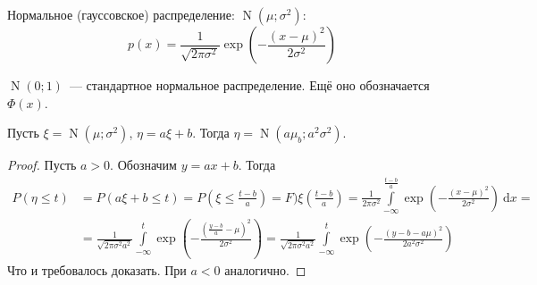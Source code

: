 \documentclass{article}
\begin{document}
    \begin{example}
        Нормальное (гауссовское) распределение: $\operatorname{N}(\mu;\sigma^2)$:
        $$
        p(x)=\frac1{\sqrt{2\pi\sigma^2}}\exp\left(-\frac{(x-\mu)^2}{2\sigma^2}\right)
        $$
        \begin{figure}[H]
        \end{figure}\noindent
        $\operatorname{N}(0;1)$~--- стандартное нормальное распределение. Ещё оно обозначается $\Phi(x)$.
    \end{example}
    \begin{claim}
        Пусть $\xi=\operatorname{N}(\mu;\sigma^2)$, $\eta=a\xi+b$. Тогда
        $\eta=\operatorname{N}(a\mu_b;a^2\sigma^2)$.
    \end{claim}
    \begin{proof}
        Пусть $a>0$. Обозначим $y=ax+b$. Тогда
        \[\begin{split}
            P(\eta\leqslant t)&=P(a\xi+b\leqslant t)=P(\xi\leqslant\frac{t-b}a)=F)\xi(\frac{t-b}a)=\frac1{2\pi\sigma^2}\int\limits_{-\infty}^{\frac{t-b}a}\exp\left(-\frac{(x-\mu)^2}{2\sigma^2}\right)~\mathrm dx=\\
            &=\frac1{\sqrt{2\pi\sigma^2a^2}}\int\limits_{-\infty}^t\exp\left(-\frac{(\frac{y-b}a-\mu)^2}{2\sigma^2}\right)=\frac1{\sqrt{2\pi\sigma^2a^2}}\int\limits_{-\infty}^t\exp\left(-\frac{(y-b-a\mu)^2}{2a^2\sigma^2}\right)
        \end{split}\]
        Что и требовалось доказать. При $a<0$ аналогично.
    \end{proof}
\end{document}
